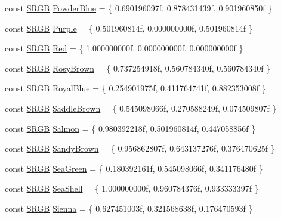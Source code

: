 \begin{DoxyCompactItemize}
\item 
const \hyperlink{structmage_1_1_s_r_g_b}{S\+R\+GB} \hyperlink{namespacemage_1_1color_a2f974671d6f2a139efbf1414b49d21df}{Powder\+Blue} = \{ 0.\+690196097f, 0.\+878431439f, 0.\+901960850f \}
\item 
const \hyperlink{structmage_1_1_s_r_g_b}{S\+R\+GB} \hyperlink{namespacemage_1_1color_a1a4dffb3c00c7eb71cfa8e33b1586e0f}{Purple} = \{ 0.\+501960814f, 0.\+000000000f, 0.\+501960814f \}
\item 
const \hyperlink{structmage_1_1_s_r_g_b}{S\+R\+GB} \hyperlink{namespacemage_1_1color_a6d620e83b3d57b75b633845e75c11fb3}{Red} = \{ 1.\+000000000f, 0.\+000000000f, 0.\+000000000f \}
\item 
const \hyperlink{structmage_1_1_s_r_g_b}{S\+R\+GB} \hyperlink{namespacemage_1_1color_a9cf3275aa615478cbfb64eff8f7e8031}{Rosy\+Brown} = \{ 0.\+737254918f, 0.\+560784340f, 0.\+560784340f \}
\item 
const \hyperlink{structmage_1_1_s_r_g_b}{S\+R\+GB} \hyperlink{namespacemage_1_1color_a39f986452e5943dc0b5f2f10ba19fefd}{Royal\+Blue} = \{ 0.\+254901975f, 0.\+411764741f, 0.\+882353008f \}
\item 
const \hyperlink{structmage_1_1_s_r_g_b}{S\+R\+GB} \hyperlink{namespacemage_1_1color_afbd77630ec00531bca18265530964fbd}{Saddle\+Brown} = \{ 0.\+545098066f, 0.\+270588249f, 0.\+074509807f \}
\item 
const \hyperlink{structmage_1_1_s_r_g_b}{S\+R\+GB} \hyperlink{namespacemage_1_1color_abbd54dd94eeec47c4bb2f7336c10a45f}{Salmon} = \{ 0.\+980392218f, 0.\+501960814f, 0.\+447058856f \}
\item 
const \hyperlink{structmage_1_1_s_r_g_b}{S\+R\+GB} \hyperlink{namespacemage_1_1color_aa08c46b7ef152452543752ee1397b64c}{Sandy\+Brown} = \{ 0.\+956862807f, 0.\+643137276f, 0.\+376470625f \}
\item 
const \hyperlink{structmage_1_1_s_r_g_b}{S\+R\+GB} \hyperlink{namespacemage_1_1color_a167c1d6fa656873256fa6a901996d3c9}{Sea\+Green} = \{ 0.\+180392161f, 0.\+545098066f, 0.\+341176480f \}
\item 
const \hyperlink{structmage_1_1_s_r_g_b}{S\+R\+GB} \hyperlink{namespacemage_1_1color_acf2ba41926c518b4b0a48661c3bf358a}{Sea\+Shell} = \{ 1.\+000000000f, 0.\+960784376f, 0.\+933333397f \}
\item 
const \hyperlink{structmage_1_1_s_r_g_b}{S\+R\+GB} \hyperlink{namespacemage_1_1color_a57c451da6e57e8e9d8b422d103830fda}{Sienna} = \{ 0.\+627451003f, 0.\+321568638f, 0.\+176470593f \}
\item 

\end{DoxyCompactItemize}
